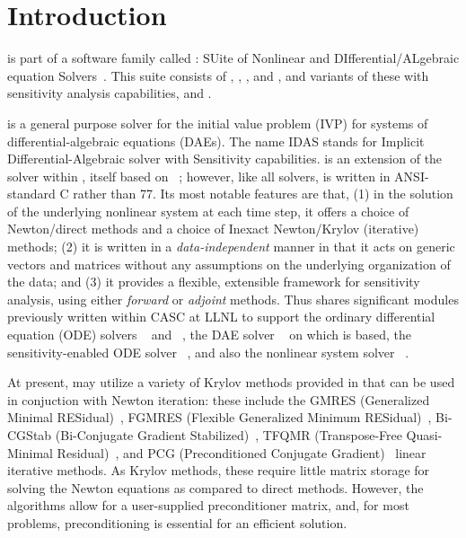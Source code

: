 \chapter{Introduction}\label{s:intro}

{\idas} is part of a software family called {\sundials}: 
SUite of Nonlinear and DIfferential/ALgebraic equation Solvers~\cite{HBGLSSW:05}. 
This suite consists of {\cvode}, {\arkode}, {\kinsol}, and {\ida}, and variants
of these with sensitivity analysis capabilities, {\cvodes} and {\idas}.

{\idas} is a general purpose solver for the initial value problem (IVP) for
systems of differential-algebraic equations (DAEs).  The name IDAS
stands for Implicit Differential-Algebraic solver with Sensitivity capabilities.
{\idas} is an extension of the {\ida} solver within {\sundials}, itself 
based on {\daspk}~\cite{BHP:94,BHP:98}; however, like all {\sundials} solvers,
{\idas} is written in ANSI-standard C rather than {\F}77.  
Its most notable features are that,
(1) in the solution of the underlying nonlinear system at each time
step, it offers a choice of Newton/direct methods and a choice of
Inexact Newton/Krylov (iterative) methods;
(2) it is written in a {\em data-independent} manner in that it acts
on generic vectors and matrices without any assumptions on the
underlying organization of the data; and
(3) it provides a flexible, extensible framework for sensitivity analysis,
using either {\em forward} or {\em adjoint} methods.
Thus {\idas} shares significant modules previously written within CASC
at LLNL to support the ordinary differential equation (ODE) solvers
{\cvode}~\cite{cvode_ug,CoHi:96} and {\pvode}~\cite{ByHi:98,ByHi:99},
the DAE solver {\ida}~\cite{ida_ug} on which {\idas} is based, the
sensitivity-enabled ODE solver {\cvodes}~\cite{cvodes_ug,SeHi:05}, and
also the nonlinear system solver {\kinsol}~\cite{kinsol_ug}.

At present, {\idas} may utilize a variety of Krylov methods provided
in {\sundials} that can be used in conjuction with Newton iteration:
these include the GMRES (Generalized Minimal RESidual)~\cite{SaSc:86},
FGMRES (Flexible Generalized Minimum RESidual)~\cite{Saa:93},
Bi-CGStab (Bi-Conjugate Gradient Stabilized)~\cite{Van:92}, TFQMR
(Transpose-Free Quasi-Minimal Residual)~\cite{Fre:93}, and PCG
(Preconditioned Conjugate Gradient)~\cite{HeSt:52} linear iterative
methods.  As Krylov methods, these require little  
matrix storage for solving the Newton equations as compared to direct 
methods. However, the algorithms allow for a user-supplied preconditioner
matrix, and, for most problems, preconditioning is essential for an
efficient solution.

